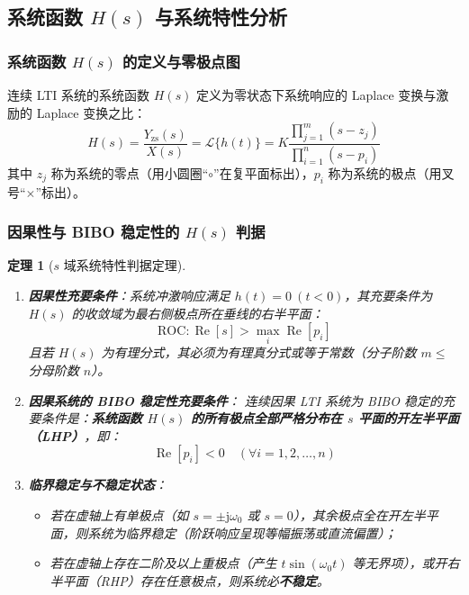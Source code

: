 \documentclass[11pt,a4paper,fontset=fandol]{ctexart}
\newtheorem{theorem}{定理}[section]
\theoremstyle{remark}
\begin{document}
\subsection{系统函数 $H(s)$ 与系统特性分析}

\subsubsection{系统函数 $H(s)$ 的定义与零极点图}
连续 LTI 系统的系统函数 $H(s)$ 定义为零状态下系统响应的 Laplace 变换与激励的 Laplace 变换之比：
\begin{equation}
    H(s) = \frac{Y_{\mathrm{zs}}(s)}{X(s)} = \mathcal{L}\{h(t)\} = K \frac{\prod_{j=1}^m (s - z_j)}{\prod_{i=1}^n (s - p_i)}
\end{equation}
其中 $z_j$ 称为系统的零点（用小圆圈“$\circ$”在复平面标出），$p_i$ 称为系统的极点（用叉号“$\times$”标出）。

\subsubsection{因果性与 BIBO 稳定性的 $H(s)$ 判据}
\begin{theorem}[$s$ 域系统特性判据定理]
\begin{enumerate}
    \item \textbf{因果性充要条件}：系统冲激响应满足 $h(t) = 0 \ (t < 0)$，其充要条件为 $H(s)$ 的收敛域为最右侧极点所在垂线的右半平面：
    \begin{equation}
        \mathrm{ROC}: \operatorname{Re}[s] > \max_{i} \operatorname{Re}[p_i]
    \end{equation}
    且若 $H(s)$ 为有理分式，其必须为有理真分式或等于常数（分子阶数 $m \le$ 分母阶数 $n$）。
    \item \textbf{因果系统的 BIBO 稳定性充要条件}：
    连续因果 LTI 系统为 BIBO 稳定的充要条件是：\textbf{系统函数 $H(s)$ 的所有极点全部严格分布在 $s$ 平面的开左半平面（LHP）}，即：
    \begin{equation}
        \operatorname{Re}[p_i] < 0 \quad (\forall i = 1, 2, \dots, n)
    \end{equation}
    \item \textbf{临界稳定与不稳定状态}：
    \begin{itemize}
        \item 若在虚轴上有单极点（如 $s = \pm \mathrm{j}\omega_0$ 或 $s = 0$），其余极点全在开左半平面，则系统为临界稳定（阶跃响应呈现等幅振荡或直流偏置）；
        \item 若在虚轴上存在二阶及以上重极点（产生 $t \sin(\omega_0 t)$ 等无界项），或开右半平面（RHP）存在任意极点，则系统必\textbf{不稳定}。
    \end{itemize}
\end{enumerate}
\end{theorem}
\end{document}
